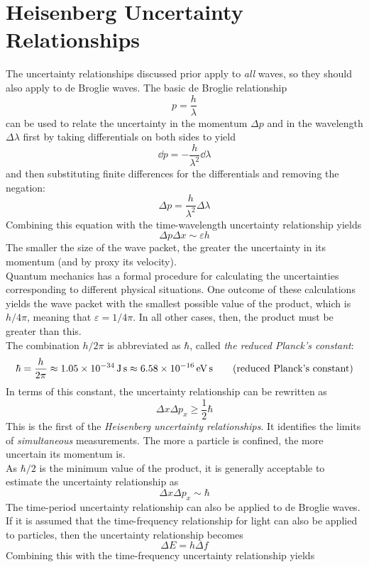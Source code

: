 \documentclass{subfiles}
\begin{document}
	\section{Heisenberg Uncertainty Relationships}
		The uncertainty relationships discussed prior apply to \textit{all} waves, so they should also apply to de Broglie waves. The basic de Broglie relationship
			\[p = \frac{h}{\lambda}\]
			can be used to relate the uncertainty in the momentum \(\Delta p\) and in the wavelength \(\Delta\lambda\) first by taking differentials on both sides to yield
			\[\dd{p} = -\frac{h}{\lambda^2}\dd{\lambda}\]
			and then substituting finite differences for the differentials and removing the negation:
			\[\Delta p = \frac{h}{\lambda^2}\Delta\lambda\]
			Combining this equation with the time-wavelength uncertainty relationship yields
			\[\Delta p \Delta x \sim \varepsilon h\]
			The smaller the size of the wave packet, the greater the uncertainty in its momentum (and by proxy its velocity). \\
		Quantum mechanics has a formal procedure for calculating the uncertainties corresponding to different physical situations. One outcome of these calculations yields the wave packet with the smallest possible value of the product, which is \(h/4\pi\), meaning that \(\varepsilon = 1/4\pi\). In all other cases, then, the product must be greater than this. \\
			The combination \(h/2\pi\) is abbreviated as \(\hbar\), called \textit{the reduced Planck's constant}:
			\[
				\hbar = \frac{h}{2\pi}
					\approx \SI{1.05E-34}{J.s}
					\approx \SI{6.58 E-16}{eV.s}
					\tag{reduced Planck's constant}
			\]
			In terms of this constant, the uncertainty relationship can be rewritten as
			\[\Delta x \Delta p_x \ge \frac{1}{2}\hbar \tag{Heisenberg position-momentum uncertainty relationship}\]
			This is the first of the \textit{Heisenberg uncertainty relationships}. It identifies the limits of \textit{simultaneous} measurements. The more a particle is confined, the more uncertain its momentum is. \\
			As \(\hbar/2\) is the minimum value of the product, it is generally acceptable to estimate the uncertainty relationship as
			\[\Delta x \Delta p_x \sim \hbar\]
		The time-period uncertainty relationship can also be applied to de Broglie waves. If it is assumed that the time-frequency relationship for light can also be applied to particles, then the uncertainty relationship becomes
			\[\Delta E = h\Delta f\]
			Combining this with the time-frequency uncertainty relationship yields
\end{document}
